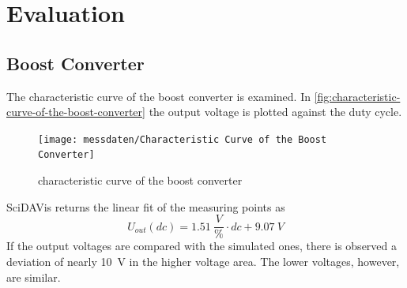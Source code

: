 \chapter{Evaluation}
%
\section{Boost Converter}
The characteristic curve of the boost converter is examined. In \vref{fig:characteristic-curve-of-the-boost-converter} the output voltage is plotted against the duty cycle.
\begin{figure}[H]
  \centering
  \texttt{[image: messdaten/Characteristic Curve of the Boost Converter]}
  \caption[characteristic curve of the boost converter]{characteristic curve of the boost converter}
  \label{fig:characteristic-curve-of-the-boost-converter}
\end{figure}
SciDAVis returns the linear fit of the measuring points as
\begin{equation}
U_{out}(dc)=\SI{1.51}{\frac{V}{\%}} \cdot dc + \SI{9.07}{V}
\end{equation}
If the output voltages are compared with the simulated ones, there is observed a deviation of nearly \SI{10}{V} in the higher voltage area. The lower voltages, however, are similar.

